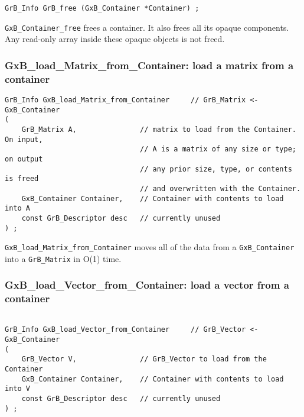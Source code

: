 \begin{mdframed}[userdefinedwidth=6in]
{\footnotesize
\begin{verbatim}
GrB_Info GrB_free (GxB_Container *Container) ;
\end{verbatim}
} \end{mdframed}

\verb'GxB_Container_free' frees a container.  It also frees all its opaque
components.  Any read-only array inside these opaque objects is not freed.

\subsubsection{{\sf GxB\_load\_Matrix\_from\_Container:} load a matrix from a container}
\label{load_matrix_from_container}

\begin{mdframed}[userdefinedwidth=6in]
{\footnotesize
\begin{verbatim}
GrB_Info GxB_load_Matrix_from_Container     // GrB_Matrix <- GxB_Container
(
    GrB_Matrix A,               // matrix to load from the Container.  On input,
                                // A is a matrix of any size or type; on output
                                // any prior size, type, or contents is freed
                                // and overwritten with the Container.
    GxB_Container Container,    // Container with contents to load into A
    const GrB_Descriptor desc   // currently unused
) ;
\end{verbatim}
} \end{mdframed}

\verb'GxB_load_Matrix_from_Container' moves all of the data from a
\verb'GxB_Container' into a \verb'GrB_Matrix' in O(1) time.

\subsubsection{{\sf GxB\_load\_Vector\_from\_Container:} load a vector from a container}
\label{load_vector_from_container}

\begin{mdframed}[userdefinedwidth=6in]
{\footnotesize
\begin{verbatim}

GrB_Info GxB_load_Vector_from_Container     // GrB_Vector <- GxB_Container
(
    GrB_Vector V,               // GrB_Vector to load from the Container
    GxB_Container Container,    // Container with contents to load into V
    const GrB_Descriptor desc   // currently unused
) ;
\end{verbatim}
} \end{mdframed}

